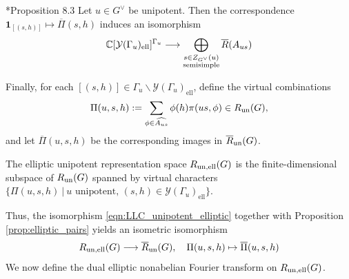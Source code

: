 \begin{proposition}\label{prop:elliptic_pairs}\cite{AubertCiubotaruRomano2024}*{Proposition 8.3} Let $u\in G^\vee$ be unipotent. Then the correspondence $\mathbf{1}_{[(s,h)]}\mapsto\overline{\Pi}(s,h)$ induces an isomorphism
    $$\mathbb{C}[\mathcal{Y}(\Gamma_u)_{\mathrm{ell}}]^{\Gamma_u}\longrightarrow\bigoplus_{\substack{s\in Z_{G^\vee}(u)\\\mathrm{semisimple}}}\overline{R}(A_{us})$$
\end{proposition}
Finally, for each $[(s,h)]\in\Gamma_u\backslash\mathcal{Y}(\Gamma_u)_{\mathrm{ell}}$, define the virtual combinations
\begin{equation}
    \Pi(u,s,h):=\sum_{\phi\in\widehat{A_{us}}}\phi(h)\pi(us,\phi)\in R_{\mathrm{un}}(G),
\end{equation}
and let $\overline{\Pi}(u,s,h)$ be the corresponding images in $\overline{R}_{\mathrm{un}}(G)$.
\begin{definition}
    The elliptic unipotent representation space $R_{\mathrm{un},\mathrm{ell}}(G)$ is the finite-dimensional subspace of $R_{\mathrm{un}}(G)$ spanned by virtual characters 
    $\{\Pi(u,s,h)\ |\ u\text{ unipotent,  }(s,h)\in\mathcal{Y}(\Gamma_u)_{\mathrm{ell}}\}.$
\end{definition}
Thus, the isomorphism \eqref{eqn:LLC_unipotent_elliptic} together with Proposition \ref{prop:elliptic_pairs} yields an isometric isomorphism
\begin{equation}
    R_{\mathrm{un},\mathrm{ell}}(G)\longrightarrow\overline{R}_{\mathrm{un}}(G),\quad\Pi(u,s,h)\mapsto\overline{\Pi}(u,s,h)
\end{equation}
We now define the dual elliptic nonabelian Fourier transform on $R_{\mathrm{un},\mathrm{ell}}(G)$. 

